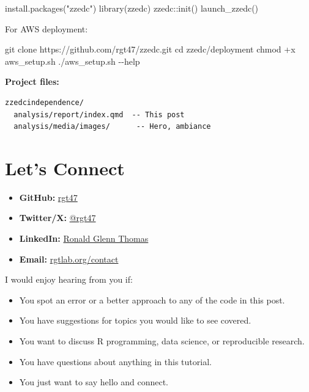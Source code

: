 \documentclass[
  letterpaper,
  DIV=11,
  numbers=noendperiod]{scrartcl}
\newenvironment{Shaded}{\begin{snugshade}}{\end{snugshade}}
\newcommand{\AttributeTok}[1]{\textcolor[rgb]{0.40,0.45,0.13}{#1}}
\newcommand{\BuiltInTok}[1]{\textcolor[rgb]{0.00,0.23,0.31}{#1}}
\newcommand{\ExtensionTok}[1]{\textcolor[rgb]{0.00,0.23,0.31}{#1}}
\newcommand{\FunctionTok}[1]{\textcolor[rgb]{0.28,0.35,0.67}{#1}}
\newcommand{\NormalTok}[1]{\textcolor[rgb]{0.00,0.23,0.31}{#1}}
\newcommand{\SpecialCharTok}[1]{\textcolor[rgb]{0.37,0.37,0.37}{#1}}
\newcommand{\StringTok}[1]{\textcolor[rgb]{0.13,0.47,0.30}{#1}}
\providecommand{\tightlist}{%
  \setlength{\itemsep}{0pt}\setlength{\parskip}{0pt}}
\begin{document}
\begin{Shaded}
\begin{Highlighting}[]
\FunctionTok{install.packages}\NormalTok{(}\StringTok{"zzedc"}\NormalTok{)}
\FunctionTok{library}\NormalTok{(zzedc)}
\NormalTok{zzedc}\SpecialCharTok{::}\FunctionTok{init}\NormalTok{()}
\FunctionTok{launch\_zzedc}\NormalTok{()}
\end{Highlighting}
\end{Shaded}

For AWS deployment:

\begin{Shaded}
\begin{Highlighting}[]
\FunctionTok{git}\NormalTok{ clone https://github.com/rgt47/zzedc.git}
\BuiltInTok{cd}\NormalTok{ zzedc/deployment}
\FunctionTok{chmod}\NormalTok{ +x aws\_setup.sh}
\ExtensionTok{./aws\_setup.sh} \AttributeTok{{-}{-}help}
\end{Highlighting}
\end{Shaded}

\textbf{Project files:}

\begin{verbatim}
zzedcindependence/
  analysis/report/index.qmd  -- This post
  analysis/media/images/      -- Hero, ambiance
\end{verbatim}

\section{Let's Connect}\label{lets-connect}

\begin{itemize}
\tightlist
\item
  \textbf{GitHub:} \href{https://github.com/rgt47}{rgt47}
\item
  \textbf{Twitter/X:} \href{https://twitter.com/rgt47}{@rgt47}
\item
  \textbf{LinkedIn:} \href{https://linkedin.com/in/rgthomaslab}{Ronald
  Glenn Thomas}
\item
  \textbf{Email:} \href{https://rgtlab.org/contact}{rgtlab.org/contact}
\end{itemize}

I would enjoy hearing from you if:

\begin{itemize}
\tightlist
\item
  You spot an error or a better approach to any of the code in this
  post.
\item
  You have suggestions for topics you would like to see covered.
\item
  You want to discuss R programming, data science, or reproducible
  research.
\item
  You have questions about anything in this tutorial.
\item
  You just want to say hello and connect.
\end{itemize}
\end{document}
